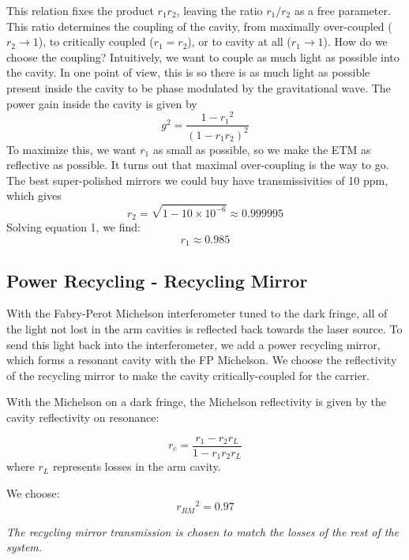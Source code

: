 This relation fixes the product $r_{1}r_{2}$, leaving the ratio $r_{1}/r_{2}$
as a free parameter. This ratio determines the coupling of the cavity,
from maximally over-coupled ($r_{2}\rightarrow1$), to critically
coupled ($r_{1}=r_{2}$), or to cavity at all ($r_{1}\rightarrow1$).
How do we choose the coupling? Intuitively, we want to couple as much
light as possible into the cavity. In one point of view, this is so
there is as much light as possible present inside the cavity to be
phase modulated by the gravitational wave. The power gain inside the
cavity is given by
\[
g^{2}=\frac{1-r_{1}{}^{2}}{\left(1-r_{1}r_{2}\right)^{2}}
\]
To maximize this, we want $r_{1}$ as small as possible, so we make
the ETM as reflective as possible. It turns out that maximal over-coupling
is the way to go. The best super-polished mirrors we could buy have
transmissivities of 10 ppm, which gives
\begin{equation}
r_{2}=\sqrt{{1-10\times10^{-6}}}\approx0.999995
\end{equation}
Solving equation 1, we find:
\begin{equation}
r_{1}\approx0.985
\end{equation}

\subsection*{Power Recycling - Recycling Mirror}

With the Fabry-Perot Michelson interferometer tuned to the dark fringe, all
of the light not lost in the arm cavities is reflected back towards
the laser source. To send this light back into the interferometer,
we add a power recycling mirror, which forms a resonant cavity with
the FP Michelson. We choose the reflectivity of the recycling mirror
to make the cavity critically-coupled for the carrier. 

With the Michelson on a dark fringe, the Michelson reflectivity is
given by the cavity reflectivity on resonance:

\begin{equation}
r_{c}=\frac{r_{1}-r_{2}r_L}{1-r_{1}r_{2}r_L}
\end{equation}
where $r_L$ represents losses in the arm cavity.

We choose:
\begin{equation}
r_{RM}{}^{2}=0.97
\end{equation}

\emph{The recycling mirror transmission is chosen to match the losses
of the rest of the system.}


